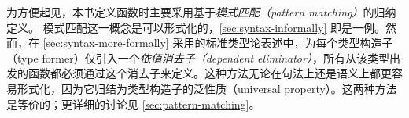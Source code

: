 %
为方便起见，本书定义函数时主要采用基于\emph{模式匹配（pattern matching）}的归纳定义。
%
%
模式匹配这一概念是可以形式化的，\cref{sec:syntax-informally} 即是一例。然而，在 \cref{sec:syntax-more-formally} 采用的标准类型论表述中，为每个类型构造子（type former）仅引入一个\emph{依值消去子（dependent eliminator）}，所有从该类型出发的函数都必须通过这个消去子来定义。这种方法无论在句法上还是语义上都更容易形式化，因为它归结为类型构造子的泛性质（universal property）。这两种方法是等价的；更详细的讨论见 \cref{sec:pattern-matching}。

%
%


